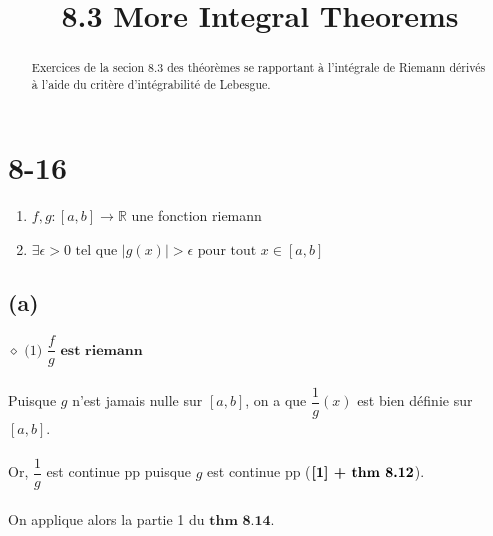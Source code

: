 \documentclass[a4paper,10pt]{article}
\title{8.3 More Integral Theorems}
\begin{document}
\maketitle

\begin{abstract}
Exercices de la secion 8.3 des théorèmes se rapportant à l'intégrale de Riemann dérivés à l'aide du critère d'intégrabilité de Lebesgue.
\end{abstract}

\section*{8-16}
\begin{enumerate}
  \item $f,g : [a,b] \rightarrow \mathbb{R}$ une fonction riemann
  \item $\exists \epsilon > 0 \text{ tel que } |g(x)| > \epsilon \text{ pour tout } x \in [a,b]$
\end{enumerate}

\subsection*{(a)}
$\diamond$  $\text{(1) } \dfrac{f}{g} \textbf{ est riemann}$
\\
\\
Puisque $g$ n'est jamais nulle sur $[a,b]$, on a que $\dfrac{1}{g} (x)$ est bien définie sur $[a,b]$. 
\\
\\
Or, $\dfrac{1}{g}$ est continue pp puisque $g$ est continue pp ($\textbf{[1] + \textbf{thm 8.12}}$).
\\
\\
On applique alors la partie 1 du $\textbf{thm 8.14}$.
\end{document}
